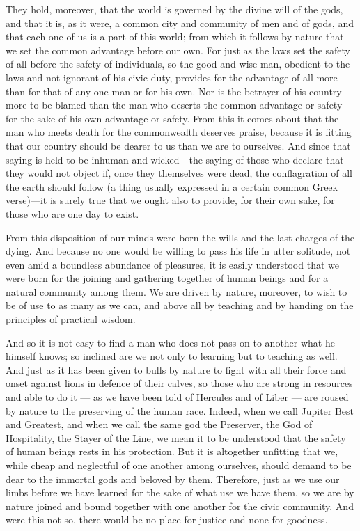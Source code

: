  They hold, moreover, that the world is governed by the divine will of the gods, and that it is, as it were, a common city and community of men and of gods, and that each one of us is a part of this world; from which it follows by nature that we set the common advantage before our own. For just as the laws set the safety of all before the safety of individuals, so the good and wise man, obedient to the laws and not ignorant of his civic duty, provides for the advantage of all more than for that of any one man or for his own. Nor is the betrayer of his country more to be blamed than the man who deserts the common advantage or safety for the sake of his own advantage or safety. From this it comes about that the man who meets death for the commonwealth deserves praise, because it is fitting that our country should be dearer to us than we are to ourselves. And since that saying is held to be inhuman and wicked—the saying of those who declare that they would not object if, once they themselves were dead, the conflagration of all the earth should follow (a thing usually expressed in a certain common Greek verse)—it is surely true that we ought also to provide, for their own sake, for those who are one day to exist.

 From this disposition of our minds were born the wills and the last charges of the dying. And because no one would be willing to pass his life in utter solitude, not even amid a boundless abundance of pleasures, it is easily understood that we were born for the joining and gathering together of human beings and for a natural community among them. We are driven by nature, moreover, to wish to be of use to as many as we can, and above all by teaching and by handing on the principles of practical wisdom.

 And so it is not easy to find a man who does not pass on to another what he himself knows; so inclined are we not only to learning but to teaching as well. And just as it has been given to bulls by nature to fight with all their force and onset against lions in defence of their calves, so those who are strong in resources and able to do it — as we have been told of Hercules and of Liber — are roused by nature to the preserving of the human race. Indeed, when we call Jupiter Best and Greatest, and when we call the same god the Preserver, the God of Hospitality, the Stayer of the Line, we mean it to be understood that the safety of human beings rests in his protection. But it is altogether unfitting that we, while cheap and neglectful of one another among ourselves, should demand to be dear to the immortal gods and beloved by them. Therefore, just as we use our limbs before we have learned for the sake of what use we have them, so we are by nature joined and bound together with one another for the civic community. And were this not so, there would be no place for justice and none for goodness.

